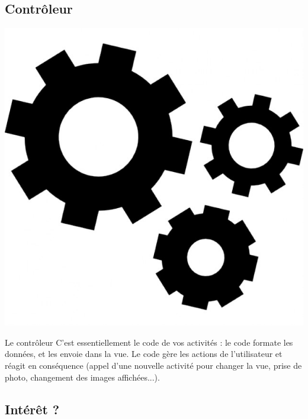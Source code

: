 \documentclass{beamer}
\begin{document}
\subsection{Contrôleur}
\begin{frame}
\begin{center}
\includegraphics[scale=0.2]{controler.jpeg}
\end{center}
\begin{block}{Le contrôleur}
C'est essentiellement le code de vos activités : le code formate les données, et les envoie dans la vue. Le code gère les actions de l'utilisateur et réagit en conséquence (appel d'une nouvelle activité pour changer la vue, prise de photo, changement des images affichées...).
\end{block}
\end{frame}

\subsection{Intérêt ?}
\end{document}
